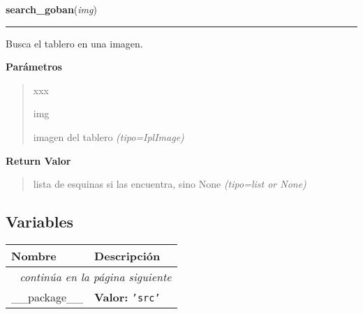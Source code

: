 \hspace{.8\funcindent}\begin{boxedminipage}{\funcwidth}

    \raggedright \textbf{search\_goban}(\textit{img})

    \vspace{-1.5ex}

    \rule{\textwidth}{0.5\fboxrule}
\setlength{\parskip}{2ex}
Busca el tablero en una imagen.

\setlength{\parskip}{1ex}
      \textbf{Parámetros}
      \vspace{-1ex}

      \begin{quote}
        \begin{Ventry}{xxx}

          \item[img]


imagen del tablero
            {\it (tipo=IplImage)}

        \end{Ventry}

      \end{quote}

      \textbf{Return Valor}
    \vspace{-1ex}

      \begin{quote}

lista de esquinas si las encuentra, sino None
      {\it (tipo=list or None)}

      \end{quote}

    \end{boxedminipage}



  \subsection{Variables}

    \vspace{-1cm}
\hspace{\varindent}\begin{longtable}{|p{\varnamewidth}|p{\vardescrwidth}|l}
\cline{1-2}
\cline{1-2} \centering \textbf{Nombre} & \centering \textbf{Descripción}& \\
\cline{1-2}
\endhead\cline{1-2}\multicolumn{3}{r}{\small\textit{continúa en la página siguiente}}\\\endfoot\cline{1-2}
\endlastfoot\raggedright \_\-\_\-p\-a\-c\-k\-a\-g\-e\-\_\-\_\- & \raggedright \textbf{Valor:} 
{\tt \texttt{'}\texttt{src}\texttt{'}}&\\
\cline{1-2}
\end{longtable}

